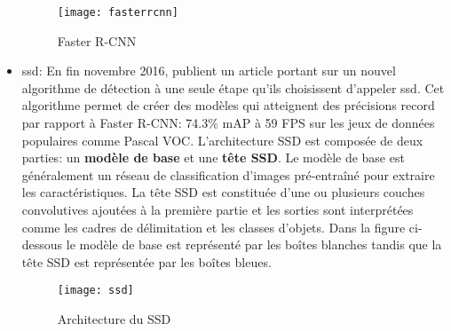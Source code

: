 \begin{itemize}
                \begin{figure}[H]
                    \centering
                    \texttt{[image: fasterrcnn]}
                    \caption{Faster R-CNN}
                \end{figure}
            \item \acrfull{ssd}: En fin novembre 2016, \citeauthor{ssd}publient un article portant sur un nouvel algorithme de détection à une seule étape qu’ils choisissent d’appeler \acrshort{ssd}. Cet algorithme permet de créer des modèles qui atteignent des précisions record par rapport à Faster R-CNN: 74.3\% mAP à 59 FPS \cite{ssd} sur les jeux de données populaires comme Pascal VOC. L’architecture SSD est composée de deux parties: un \textbf{modèle de base} et une \textbf{tête SSD}. Le modèle de base est généralement un réseau de classification d'images pré-entraîné pour extraire les caractéristiques. La tête SSD est constituée d’une ou plusieurs couches convolutives ajoutées à la première partie et les sorties sont interprétées comme les cadres de délimitation et les classes d'objets. Dans la figure ci-dessous le modèle de base est représenté par les boîtes blanches tandis que la tête SSD est représentée par les boîtes bleues.
                \begin{figure}
                    \centering
                    \texttt{[image: ssd]}
                    \caption{Architecture du SSD}
                \end{figure}


\end{itemize}
